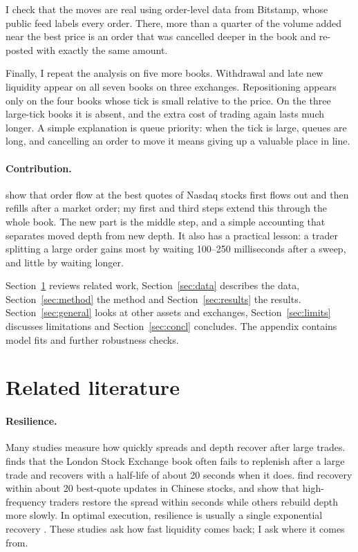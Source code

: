 \documentclass[12pt]{article}
\begin{document}
I check that the moves are real using order-level data from Bitstamp, whose public feed labels
every order. There, more than a quarter of the volume added near the best price is an order that
was cancelled deeper in the book and re-posted with exactly the same amount.

Finally, I repeat the analysis on five more books. Withdrawal and late new liquidity appear on
all seven books on three exchanges. Repositioning appears only on the four books whose tick is
small relative to the price. On the three large-tick books it is absent, and the extra cost of
trading again lasts much longer. A simple explanation is queue priority: when the tick is large,
queues are long, and cancelling an order to move it means giving up a valuable place in line.

\paragraph{Contribution.} \citet{bonart2017latency} show that order flow at the best quotes of
Nasdaq stocks first flows out and then refills after a market order; my first and third steps
extend this through the whole book. The new part is the middle step, and a simple accounting
that separates moved depth from new depth. It also has a practical lesson: a trader splitting a
large order gains most by waiting 100--250 milliseconds after a sweep, and little by waiting
longer.

Section~\ref{sec:lit} reviews related work, Section~\ref{sec:data} describes the data,
Section~\ref{sec:method} the method and Section~\ref{sec:results} the results.
Section~\ref{sec:general} looks at other assets and exchanges, Section~\ref{sec:limits} discusses
limitations and Section~\ref{sec:concl} concludes. The appendix contains model fits and further
robustness checks.

\section{Related literature}
\label{sec:lit}

\paragraph{Resilience.} Many studies measure how quickly spreads and depth recover after large
trades. \citet{large2007resiliency} finds that the London Stock Exchange book often fails to
replenish after a large trade and recovers with a half-life of about 20 seconds when it does.
\citet{xu2017resiliency} find recovery within about 20 best-quote updates in Chinese stocks, and
\citet{clapham2021speed} show that high-frequency traders restore the spread within seconds while
others rebuild depth more slowly. In optimal execution, resilience is usually a single
exponential recovery \citep{obizhaeva2013optimal,alfonsi2010optimal}. These studies ask how fast
liquidity comes back; I ask where it comes from.
\end{document}
